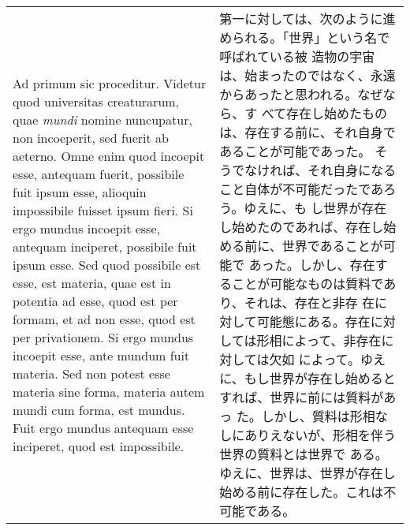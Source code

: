 \documentclass[10pt]{jsarticle} %
\begin{document}
\begin{longtable}{p{21em}p{21em}}
{\huge A}{\sc d primum sic proceditur. Videtur} quod universitas creaturarum, quae
{\itshape mundi} nomine nuncupatur,
non incoeperit, sed fuerit ab aeterno. Omne
enim quod incoepit esse, antequam fuerit, possibile fuit ipsum esse,
alioquin impossibile fuisset ipsum fieri. Si ergo mundus incoepit esse,
antequam inciperet, possibile fuit ipsum esse. Sed quod possibile est
esse, est materia, quae est in potentia ad esse, quod est per formam, et
ad non esse, quod est per privationem. Si ergo mundus incoepit esse,
ante mundum fuit materia. Sed non potest esse materia sine forma,
materia autem mundi cum forma, est mundus. Fuit ergo mundus antequam
esse inciperet, quod est impossibile.


& 第一に対しては、次のように進められる。「世界」という名で呼ばれている被
造物の宇宙は、始まったのではなく、永遠からあったと思われる。なぜなら、す
べて存在し始めたものは、存在する前に、それ自身であることが可能であった。
そうでなければ、それ自身になること自体が不可能だったであろう。ゆえに、も
し世界が存在し始めたのであれば、存在し始める前に、世界であることが可能で
あった。しかし、存在することが可能なものは質料であり、それは、存在と非存
在に対して可能態にある。存在に対しては形相によって、非存在に対しては欠如
によって。ゆえに、もし世界が存在し始めるとすれば、世界に前には質料があっ
た。しかし、質料は形相なしにありえないが、形相を伴う世界の質料とは世界で
ある。ゆえに、世界は、世界が存在し始める前に存在した。これは不可能である。


\end{longtable}

\end{document}
